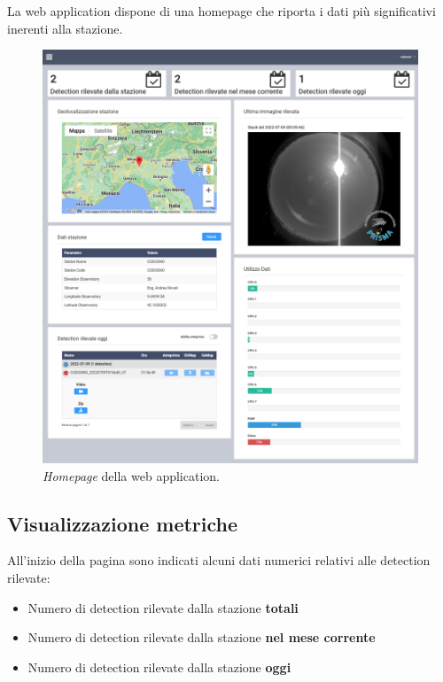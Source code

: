 La web application dispone di una homepage che riporta i dati più significativi inerenti alla stazione.

\begin{figure}[H]
    \begin{center}
    \includegraphics[width=\textwidth]{images/full-home.png}
    \caption{\emph{Homepage} della web application.}
    \label{fig:homepage}
    \end{center}
\end{figure}

\subsection{Visualizzazione metriche}

All'inizio della pagina sono indicati alcuni dati numerici relativi alle detection rilevate:
\begin{itemize}[noitemsep,nolistsep]
    \item Numero di detection rilevate dalla stazione \textbf{totali}
    \item Numero di detection rilevate dalla stazione \textbf{nel mese corrente}
    \item Numero di detection rilevate dalla stazione \textbf{oggi}
\end{itemize}

